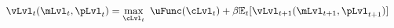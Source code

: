   \begin{equation}\begin{gathered}\begin{aligned}
       \vLvl
_{t}(\mLvl_{t},\pLvl_{t})  & = \max_{\cLvl_{t}}~ \uFunc(\cLvl_{t}) + {\DiscAlt}\Ex_{t}[\vLvl
_{t+1}(\mLvl_{t+1},\pLvl_{t+1})]\label{eq:vrecurse}
      \end{aligned}\end{gathered}\end{equation}
